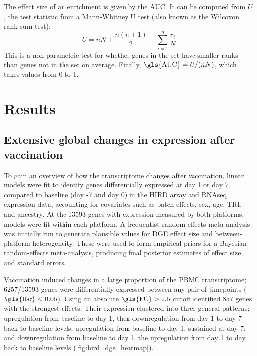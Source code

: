 The effect size of an enrichment is given by the \gls{AUC}.
It can be computed from $U$, the test statistic from a Mann-Whitney U test (also known as the Wilcoxon rank-sum test):
\begin{equation}
    U = nN + \frac{n(n + 1)}{2} - \sum_{i=1}^{n} \frac{r_i}{N}
\end{equation}
This is a non-parametric test for whether genes in the set have smaller ranks than genes not in the set on average.
Finally, $\text{\gls{AUC}} = U/(nN)$, which takes values from 0 to 1.

\section{Results}

\subsection{Extensive global changes in expression after vaccination}

To gain an overview of how the transcriptome changes after vaccination, linear models were fit to identify genes differentially expressed at day 1 or day 7 compared to baseline (day -7 and day 0) in the \gls{HIRD} array and \gls{RNAseq} expression data, accounting for covariates such as batch effects, sex, age, \gls{TRI}, and ancestry.
At the \num{13593} genes with expression measured by both platforms, models were fit within each platform.
A frequentist random-effects meta-analysis was initially run to generate plausible values for \gls{DGE} effect size and between-platform heterogeneity.
These were used to form empirical priors for a Bayesian random-effects meta-analysis, producing final posterior estimates of effect size and standard errors.

Vaccination induced changes in a large proportion of the \gls{PBMC} transcriptome; \num{6257/13593} genes were differentially expressed between any pair of timepoints ($\text{\gls{lfsr}} < 0.05$).
Using an absolute $\text{\gls{FC}} > 1.5$ cutoff identified 857 genes with the strongest effects.
Their expression clustered into three general patterns:
    upregulation from baseline to day 1, then downregulation from day 1 to day 7 back to baseline levels;
    upregulation from baseline to day 1, sustained at day 7; 
    and downregulation from baseline to day 1, the upregulation from day 1 to day back to baseline levels (\cref{fig:hird_dge_heatmap}).
%
 
